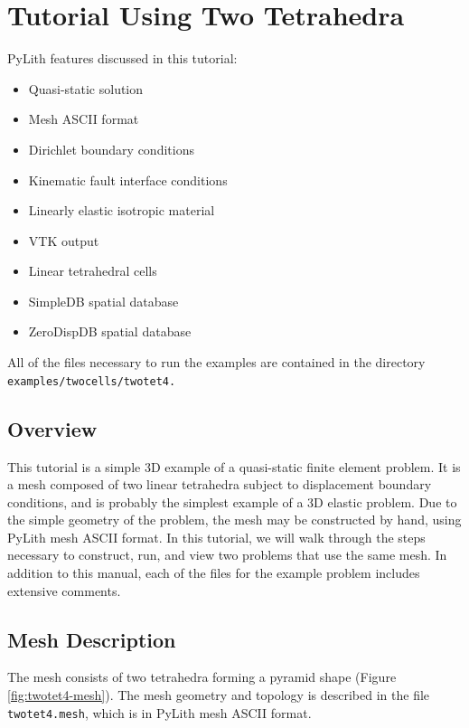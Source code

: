 
\section{\label{sec:Tutorial-Two-tet4}Tutorial Using Two Tetrahedra}

PyLith features discussed in this tutorial:
\begin{itemize}
\item Quasi-static solution
\item Mesh ASCII format
\item Dirichlet boundary conditions
\item Kinematic fault interface conditions
\item Linearly elastic isotropic material
\item VTK output
\item Linear tetrahedral cells
\item SimpleDB spatial database
\item ZeroDispDB spatial database
\end{itemize}
All of the files necessary to run the examples are contained in the
directory \texttt{examples/twocells/twotet4.}


\subsection{Overview}

This tutorial is a simple 3D example of a quasi-static finite element
problem. It is a mesh composed of two linear tetrahedra subject to
displacement boundary conditions, and is probably the simplest example
of a 3D elastic problem. Due to the simple geometry of the problem,
the mesh may be constructed by hand, using PyLith mesh ASCII format.
In this tutorial, we will walk through the steps necessary to construct,
run, and view two problems that use the same mesh. In addition to
this manual, each of the files for the example problem includes extensive
comments.


\subsection{Mesh Description}

The mesh consists of two tetrahedra forming a pyramid shape (Figure
\vref{fig:twotet4-mesh}). The mesh geometry and topology is described
in the file \texttt{twotet4.mesh}, which is in PyLith mesh ASCII format.


